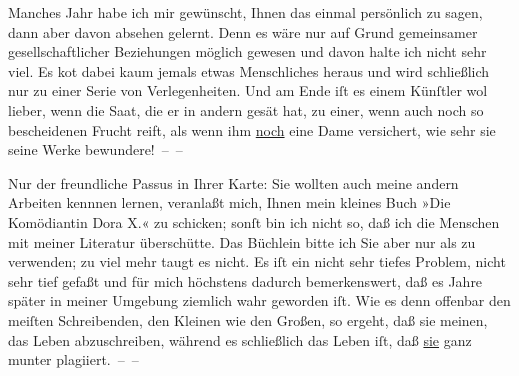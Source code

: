 \pstart
           {\pb}Manches Jahr habe ich mir gewünscht, Ihnen das einmal
               persönlich zu sagen, dann aber davon absehen gelernt. Denn es wäre nur auf Grund
               gemeinsamer gesellschaftlicher Beziehungen möglich gewesen und davon halte ich nicht
               sehr viel. Es ko{\geminationm}t dabei kaum jemals etwas Menschliches
               heraus und wird schließlich nur zu einer Serie von Verlegenheiten. Und am Ende iſt es
               einem Künſtler wol lieber, wenn die Saat, die er in andern gesät hat, zu einer, wenn
               auch noch so bescheidenen Frucht reift, als wenn ihm \uline{noch} eine Dame versichert, wie sehr sie seine Werke bewundere! – –\pend
           
\pstart
           Nur der freundliche Passus in Ihrer Karte: Sie wollten auch meine andern Arbeiten
               kennnen lernen, veranlaßt mich, Ihnen mein kleines Buch »Die Komödiantin Dora X.« zu schicken; sonſt bin ich nicht so,
               daß ich die Menschen mit meiner Literatur überschütte. Das Büchlein bitte ich Sie\strikeout{,} aber nur als \label{K_L02572-2v}\label{K_L02572-2} zu verwenden; zu viel mehr taugt es nicht. Es iſt ein nicht sehr tiefes
               Problem, nicht sehr tief gefaßt und für mich höchstens dadurch bemerkenswert, daß es
               Jahre später in meiner Umgebung ziemlich wahr geworden iſt. Wie es denn offenbar den
               meiſten Schreibenden, den Kleinen wie den Großen, so ergeht, {\pb}daß sie meinen, das Leben abzuschreiben, während es schließlich das Leben iſt, daß
                  \uline{sie} ganz munter plagiiert. – –\pend
           
